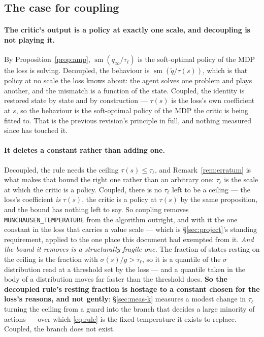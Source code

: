\documentclass{article}
\DeclareMathOperator{\sm}{sm}
\newcommand{\srank}{\sigma}
\begin{document}
\subsection{The case for coupling}
\label{sec:couple-case}

\paragraph{The critic's output is a policy at exactly one scale, and decoupling is not playing
it.} By Proposition~\ref{prop:amp}, $\sm(q_\infty/\tau_\ell)$ is the soft-optimal policy of the
MDP the loss is solving. Decoupled, the behaviour is $\sm(\tilde{q}/\tau(s))$, which is that
policy at no scale the loss knows about: the agent solves one problem and plays another, and the
mismatch is a function of the state. Coupled, the identity is restored state by state and by
construction --- $\tau(s)$ is the loss's own coefficient at $s$, so the behaviour is the
soft-optimal policy of the MDP the critic is being fitted to. That is the previous revision's
principle in full, and nothing measured since has touched it.

\paragraph{It deletes a constant rather than adding one.} Decoupled, the rule needs the ceiling
$\tau(s) \le \tau_\ell$, and Remark~\ref{rem:erratum} is what makes that bound the right one
rather than an arbitrary one: $\tau_\ell$ is the scale at which the critic is a policy. Coupled,
there is no $\tau_\ell$ left to be a ceiling --- the loss's coefficient \emph{is} $\tau(s)$, the
critic is a policy at $\tau(s)$ by the same proposition, and the bound has nothing left to say.
So coupling removes \texttt{MUNCHAUSEN\_TEMPERATURE} from the algorithm outright, and with it the
one constant in the loss that carries a value scale --- which is \S\ref{sec:project}'s standing
requirement, applied to the one place this document had exempted from it. \emph{And the bound it
removes is a structurally fragile one.} The fraction of states resting on the ceiling is the
fraction with $\srank(s)/g > \tau_\ell$, so it is a quantile of the $\srank$ distribution read at
a threshold set by the loss --- and a quantile taken in the body of a distribution moves far
faster than the threshold does. \textbf{So the decoupled rule's resting fraction is hostage to a
constant chosen for the loss's reasons, and not gently}: \S\ref{sec:meas-k} measures a modest
change in $\tau_\ell$ turning the ceiling from a guard into the branch that decides a large
minority of actions --- over which \eqref{eq:rule} is the fixed temperature it exists to replace.
Coupled, the branch does not exist.
\end{document}
